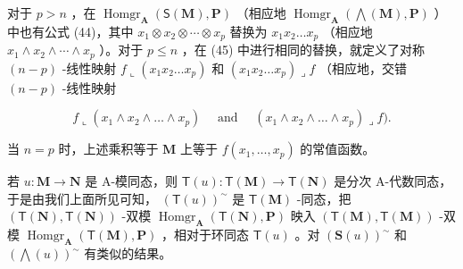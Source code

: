 对于 \(p > n\) ，在 \(\operatorname{Homgr}_{\mathbf{A}}(\mathsf{S}(\mathbf{M}), \mathbf{P})\) （相应地 \(\operatorname{Homgr}_{\mathbf{A}}(\bigwedge(\mathbf{M}), \mathbf{P})\) ）中也有公式 (44)，其中 \(x_1 \otimes x_2 \otimes \cdots \otimes x_p\) 替换为 \(x_1x_2 \ldots x_p\) （相应地 \(x_1 \wedge x_2 \wedge \cdots \wedge x_p\) ）。对于 \(p \leqslant n\) ，在 (45) 中进行相同的替换，就定义了对称 \((n - p)\) -线性映射 \(f \llcorner (x_1x_2 \ldots x_p)\) 和 \((x_1x_2 \ldots x_p) \lrcorner f\) （相应地，交错 \((n - p)\) -线性映射

\[
f \llcorner (x _ {1} \wedge x _ {2} \wedge \dots \wedge x _ {p}) \quad \text { and } \quad (x _ {1} \wedge x _ {2} \wedge \dots \wedge x _ {p}) \lrcorner f).
\]

当 \(n = p\) 时，上述乘积等于 \(\mathbf{M}\) 上等于 \(f(x_{1},\ldots ,x_{p})\) 的常值函数。

若 \(u: \mathbf{M} \to \mathbf{N}\) 是 A-模同态，则 \(\mathsf{T}(u): \mathsf{T}(\mathbf{M}) \to \mathsf{T}(\mathbf{N})\) 是分次 A-代数同态，于是由我们上面所见可知， \((\mathsf{T}(u))^{\sim}\) 是 \(\mathsf{T}(\mathbf{M})\) -同态，把 \((\mathsf{T}(\mathbf{N}), \mathsf{T}(\mathbf{N}))\) -双模 \(\operatorname{Homgr}_{\mathbf{A}}(\mathsf{T}(\mathbf{N}), \mathbf{P})\) 映入 \((\mathsf{T}(\mathbf{M}), \mathsf{T}(\mathbf{M}))\) -双模 \(\operatorname{Homgr}_{\mathbf{A}}(\mathsf{T}(\mathbf{M}), \mathbf{P})\) ，相对于环同态 \(\mathsf{T}(u)\) 。对 \((\mathbf{S}(u))^{\sim}\) 和 \((\bigwedge(u))^{\sim}\) 有类似的结果。
\relax{}
